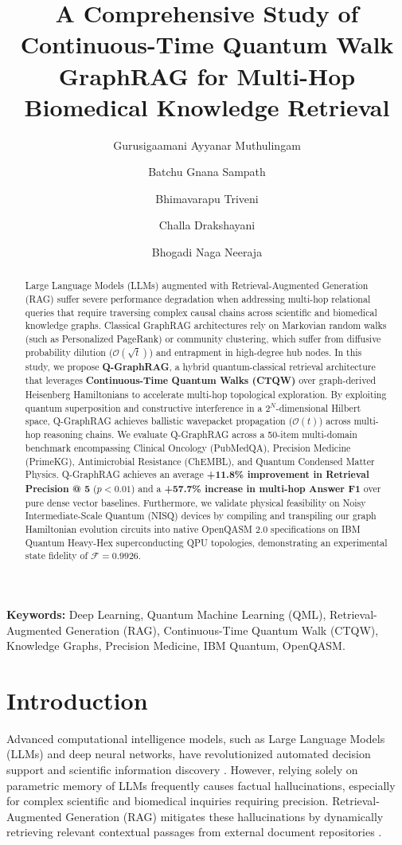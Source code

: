 \documentclass[11pt,a4paper]{article}
\title{\textbf{A Comprehensive Study of Continuous-Time Quantum Walk GraphRAG for Multi-Hop Biomedical Knowledge Retrieval}}
\author[1*]{Gurusigaamani Ayyanar Muthulingam}
\author[1$\dagger$]{Batchu Gnana Sampath}
\author[1$\dagger$]{Bhimavarapu Triveni}
\author[1$\dagger$]{Challa Drakshayani}
\author[1$\dagger$]{Bhogadi Naga Neeraja}
\affil[1]{Department of Computer Science and Engineering, Kalasalingam Academy of Research and Education, Krishnankovil, Tamil Nadu, 626126, India.}
\affil[*]{Corresponding author: \texttt{gurusigaamani@klu.ac.in}}
\affil[$\dagger$]{These authors contributed equally to this work.}
\date{}
\begin{document}
\maketitle

\begin{abstract}
Large Language Models (LLMs) augmented with Retrieval-Augmented Generation (RAG) suffer severe performance degradation when addressing multi-hop relational queries that require traversing complex causal chains across scientific and biomedical knowledge graphs. Classical GraphRAG architectures rely on Markovian random walks (such as Personalized PageRank) or community clustering, which suffer from diffusive probability dilution ($\mathcal{O}(\sqrt{t})$) and entrapment in high-degree hub nodes. In this study, we propose \textbf{Q-GraphRAG}, a hybrid quantum-classical retrieval architecture that leverages \textbf{Continuous-Time Quantum Walks (CTQW)} over graph-derived Heisenberg Hamiltonians to accelerate multi-hop topological exploration. By exploiting quantum superposition and constructive interference in a $2^N$-dimensional Hilbert space, Q-GraphRAG achieves ballistic wavepacket propagation ($\mathcal{O}(t)$) across multi-hop reasoning chains. We evaluate Q-GraphRAG across a 50-item multi-domain benchmark encompassing Clinical Oncology (PubMedQA), Precision Medicine (PrimeKG), Antimicrobial Resistance (ChEMBL), and Quantum Condensed Matter Physics. Q-GraphRAG achieves an average \textbf{+11.8\% improvement in Retrieval Precision @ 5} ($p < 0.01$) and a \textbf{+57.7\% increase in multi-hop Answer F1} over pure dense vector baselines. Furthermore, we validate physical feasibility on Noisy Intermediate-Scale Quantum (NISQ) devices by compiling and transpiling our graph Hamiltonian evolution circuits into native OpenQASM 2.0 specifications on IBM Quantum Heavy-Hex superconducting QPU topologies, demonstrating an experimental state fidelity of $\mathcal{F} = 0.9926$.
\end{abstract}

\textbf{Keywords:} Deep Learning, Quantum Machine Learning (QML), Retrieval-Augmented Generation (RAG), Continuous-Time Quantum Walk (CTQW), Knowledge Graphs, Precision Medicine, IBM Quantum, OpenQASM.

\section{Introduction}
Advanced computational intelligence models, such as Large Language Models (LLMs) and deep neural networks, have revolutionized automated decision support and scientific information discovery \cite{lewis2020retrieval}. However, relying solely on parametric memory of LLMs frequently causes factual hallucinations, especially for complex scientific and biomedical inquiries requiring precision. Retrieval-Augmented Generation (RAG) mitigates these hallucinations by dynamically retrieving relevant contextual passages from external document repositories \cite{edge2024graphrag}.
\end{document}
